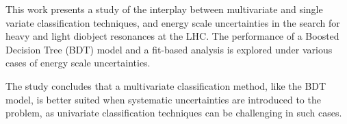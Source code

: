 This work presents a study of the interplay between multivariate and single variate classification techniques, and energy scale uncertainties in the search for heavy and light diobject resonances at the LHC. The performance of a Boosted Decision Tree (BDT) model and a fit-based analysis is explored under various cases of energy scale uncertainties.

The study concludes that a multivariate classification method, like the BDT model, is better suited when systematic uncertainties are introduced to the problem, as univariate classification techniques can be challenging in such cases.
